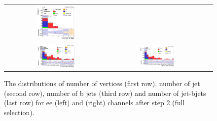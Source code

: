 \begin{figure}[ht]
\begin{center}
\begin{tabular}{ccc}
      \includegraphics[width=0.4\textwidth]{figures/tW/fig/Step2/mumu/H_N_b_jets.png}\\
      \includegraphics[width=0.4\textwidth]{figures/tW/fig/Step2/ee/H_njet_bjet.png}&
      \includegraphics[width=0.4\textwidth]{figures/tW/fig/Step2/mumu/H_njet_bjet.png}\\
    \end{tabular}
    \caption{The distributions of number of vertices (first row), number of jet (second row), number of b jets (third row) and number of jet-bjets (last row) for ee (left) and \mumu (right) channels after step 2 (full selection).
    \label{fig:step2_Nvtx_jet_bjet}}
  \end{center}
\end{figure}


